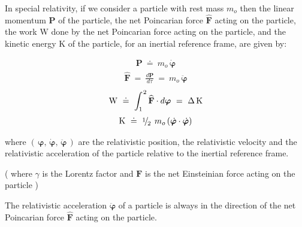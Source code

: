 \documentclass[10pt,fleqn]{article}
\newcommand{\med}{\raise.5ex\hbox{$\scriptstyle 1$}\kern-.15em/\kern-.12em\lower.45ex\hbox{$\scriptstyle 2$}\;}
\begin{document}
\noindent In special relativity, if we consider a particle with rest mass $m_o$ then the linear momentum $\mathbf{P}$ of the particle, the net Poincarian force $\mathbf{\widehat{F}}$ acting on the particle, the work $\mathrm{W}$ done by the net Poincarian force acting on the particle, and the kinetic energy $\mathrm{K}$ of the particle, for an inertial reference frame, are given by:
\par \vspace{-0.30em}
\begin{eqnarray*}
\mathbf{P} ~\doteq~ m_o \, \dot{\boldsymbol{\varphi}}
\end{eqnarray*}
\vspace{-0.30em}
\begin{eqnarray*}
\mathbf{\widehat{F}} ~=~ \frac{d\mathbf{P}}{d{\tau}} ~=~ m_o \, \ddot{\boldsymbol{\varphi}}
\end{eqnarray*}
\vspace{-0.30em}
\begin{eqnarray*}
\mathrm{W} ~\doteq~ \int_1^{\hspace{+0.06em}2} \mathbf{\widehat{F}} \cdot d{{\boldsymbol{\varphi}}} ~=~ \Delta \, \mathrm{K}
\end{eqnarray*}
\vspace{-0.30em}
\begin{eqnarray*}
\mathrm{K} ~\doteq~ \med \, m_o \, ( \dot{\boldsymbol{\varphi}} \cdot \dot{\boldsymbol{\varphi}} )
\end{eqnarray*}
\par \vspace{+0.90em}
\noindent where $( \, {\boldsymbol{\varphi}}, \, \dot{\boldsymbol{\varphi}}, \, \ddot{\boldsymbol{\varphi}} \, )$ are the relativistic position, the relativistic velocity and the relativistic acceleration of the particle relative to the inertial reference frame.
\par \vspace{+1.50em}
 ( where {\small $\gamma$} is the Lorentz factor and {\small $\mathbf{F}$} is the net Einsteinian force acting on the particle )
\par \vspace{+1.50em}
\noindent The relativistic acceleration $\ddot{\boldsymbol{\varphi}}$ of a particle is always in the direction of the net Poincarian force $\mathbf{\widehat{F}}$ acting on the particle.
\end{document}
